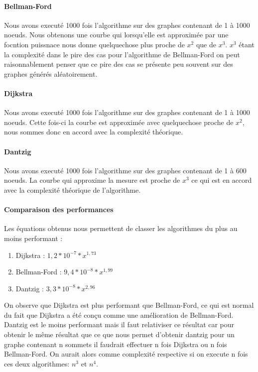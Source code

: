 \documentclass[a4paper,12pt,final] {article}
\begin{document}
\paragraph{Bellman-Ford}
Nous avons executé 1000 fois l'algorithme sur des graphes contenant de 1 à 1000 noeuds.
Nous obtenons une courbe qui lorsqu'elle est approximée par une focntion puissnace nous donne quelquechose plus proche de $x^{2}$ que de $x^{3}$. $x^{3}$ étant la complexité dans le pire des cas pour l'algorithme de Bellman-Ford on peut raisonnablement penser que ce pire des cas se présente peu souvent sur des graphes générés aléatoirement.
\paragraph{Dijkstra}
Nous avons executé 1000 fois l'algorithme sur des graphes contenant de 1 à 1000 noeuds.
Cette fois-ci la courbe est approximée avec quelquechose proche de $x^{2}$, nous sommes donc en accord avec la complexité théorique.
\paragraph{Dantzig}
Nous avons executé 1000 fois l'algorithme sur des graphes contenant de 1 à 600 noeuds.
La courbe qui approxime la mesure est proche de $x^{3}$ ce qui est en accord avec la complexité théorique de l'algorithme.
\paragraph{Comparaison des performances}
Les équations obtenus nous permettent de classer les algorithmes du plus au moins performant :
\begin{enumerate}
\item Dijkstra :  $1,2*10^{-7}*x^{1,73}$
\item Bellman-Ford :  $9,4*10^{-8}*x^{1,99}$
\item Dantzig : $3,3*10^{-8}*x^{2,96}$
\end{enumerate}
On observe que Dijkstra est plus performant que Bellman-Ford, ce qui est normal du fait que Dijkstra a été con\c cu comme une amélioration de Bellman-Ford.\\
Dantzig est le moins performant mais il faut relativiser ce résultat car pour obtenir le même résultat que ce que nous permet d'obtenir dantzig pour un graphe contenant n sommets il faudrait effectuer n fois Dijkstra ou n fois Bellman-Ford. On aurait alors comme complexité respective si on execute n fois ces deux algorithmes: $n^{3}$ et $n^{4}$.
\end{document}
